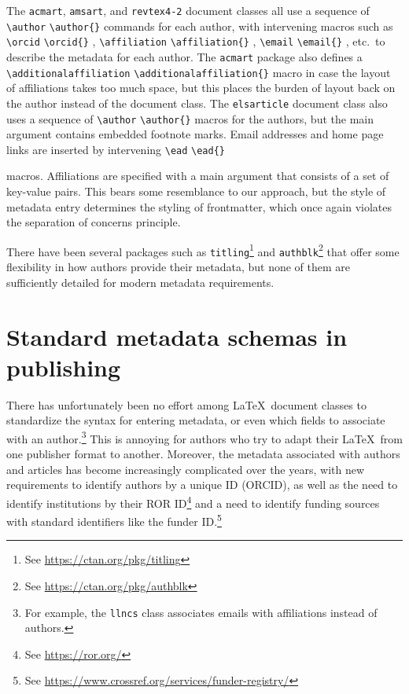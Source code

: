 \documentclass{article}
\newcommand{\cmd}[2][]{%
  \def\FirstArg{#1}%
  \ifx\FirstArg\empty%
    \texttt{\textbackslash{}#2}%
  \else%
    \texttt{\textbackslash{}#2\{#1\}}%
  \fi
}
\newcommand{\pkg}[1]{\texttt{#1}}
\begin{document}
The \pkg{acmart}, \pkg{amsart}, and \pkg{revtex4-2} document classes
all use a sequence of \cmd{author} commands for each author, with
intervening macros such
as \cmd{orcid}, \cmd{affiliation}, \cmd{email}, etc.\ to describe the
metadata for each author.  The \pkg{acmart} package also defines a
\cmd{additionalaffiliation} macro in case the layout of affiliations
takes too much space, but this places the burden of layout back on the
author instead of the document class.  The \pkg{elsarticle} document
class also uses a sequence of \cmd{author} macros for the authors, but
the main argument contains embedded footnote marks.  Email addresses
and home page links are inserted by intervening \cmd{ead}
macros. Affiliations are specified with a main argument that consists
of a set of key-value pairs. This bears some resemblance to our
approach, but the style of metadata entry determines the styling of
frontmatter, which once again violates the separation of concerns
principle.

There have been several packages such
as \pkg{titling}\footnote{See \url{https://ctan.org/pkg/titling}}
and \pkg{authblk}\footnote{See \url{https://ctan.org/pkg/authblk}}
that offer some flexibility in how authors provide their metadata, but
none of them are sufficiently detailed for modern metadata
requirements.

\section{Standard metadata schemas in publishing}
There has unfortunately been no effort among \LaTeX\ document classes
to standardize the syntax for entering metadata, or even which fields
to associate with an author.\footnote{For example, the \pkg{llncs}
class associates emails with affiliations instead of authors.}
This is annoying for authors who try to adapt their \LaTeX\ from one
publisher format to another. Moreover, the metadata associated with authors
and articles has become increasingly complicated over the years, with
new requirements to identify authors by a unique ID (ORCID), as well
as the need to identify institutions by their ROR ID\footnote{See \url{https://ror.org/}}
and a need to identify funding sources with standard identifiers like the
funder ID.\footnote{See \url{https://www.crossref.org/services/funder-registry/}}
\end{document}
